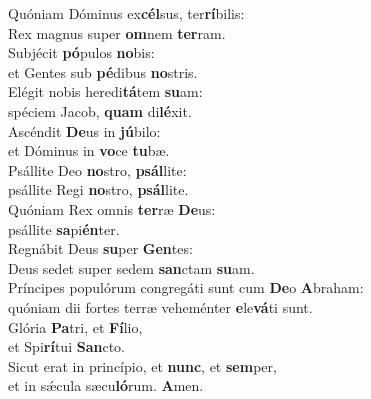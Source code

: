 \evenverse Quóniam Dóminus ex\textbf{cél}sus, ter\textbf{rí}bilis:~\*\\
\evenverse Rex magnus super \textbf{om}nem \textbf{ter}ram.\\
\oddverse Subjécit \textbf{pó}pulos \textbf{no}bis:~\*\\
\oddverse et Gentes sub \textbf{pé}dibus \textbf{no}stris.\\
\evenverse Elégit nobis heredi\textbf{tá}tem \textbf{su}am:~\*\\
\evenverse spéciem Jacob, \textbf{quam} di\textbf{lé}xit.\\
\oddverse Ascéndit \textbf{De}us in \textbf{jú}bilo:~\*\\
\oddverse et Dóminus in \textbf{vo}ce \textbf{tu}bæ.\\
\evenverse Psállite Deo \textbf{no}stro, \textbf{psál}lite:~\*\\
\evenverse psállite Regi \textbf{no}stro, \textbf{psál}lite.\\
\oddverse Quóniam Rex omnis \textbf{ter}ræ \textbf{De}us:~\*\\
\oddverse psállite \textbf{sa}pi\textbf{én}ter.\\
\evenverse Regnábit Deus \textbf{su}per \textbf{Gen}tes:~\*\\
\evenverse Deus sedet super sedem \textbf{san}ctam \textbf{su}am.\\
\oddverse Príncipes populórum congregáti sunt cum \textbf{De}o \textbf{A}braham:~\*\\
\oddverse quóniam dii fortes terræ veheménter \textbf{e}le\textbf{vá}ti sunt.\\
\evenverse Glória \textbf{Pa}tri, et \textbf{Fí}lio,~\*\\
\evenverse et Spi\textbf{rí}tui \textbf{San}cto.\\
\oddverse Sicut erat in princípio, et \textbf{nunc}, et \textbf{sem}per,~\*\\
\oddverse et in sǽcula sæcu\textbf{ló}rum. \textbf{A}men.\\
